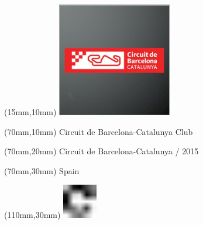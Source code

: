 \null\newpage
\begin{textblock*}{50mm}(15mm,10mm)%
\includegraphics[width=50mm]{LG/2015-05-20_00078.png}
\end{textblock*}
\begin{textblock*}{130mm}(70mm,10mm)%
{\fontsize{20}{20}\selectfont Circuit de Barcelona-Catalunya Club}\\
\end{textblock*}
\begin{textblock*}{120mm}(70mm,20mm)%
{\fontsize{16}{16}\selectfont Circuit de Barcelona-Catalunya / 2015}\\
\end{textblock*}
\begin{textblock*}{120mm}(70mm,30mm)%
{\fontsize{12}{12}\selectfont Spain}
\end{textblock*}
\begin{textblock*}{30mm}(110mm,30mm)%
\centering
\includegraphics[height=15mm]{icons/fa-rotate-right.pdf}
\end{textblock*}
